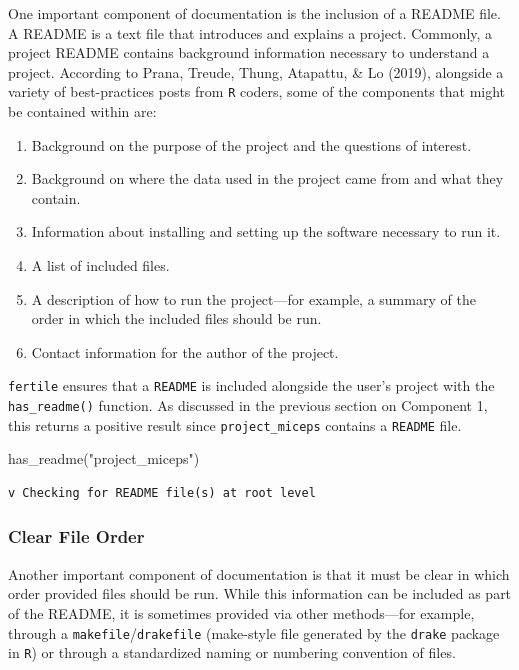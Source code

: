 \documentclass[12pt,twoside]{reedthesis}
\newenvironment{Shaded}{\begin{snugshade}}{\end{snugshade}}
\newcommand{\FunctionTok}[1]{\textcolor[rgb]{0.00,0.00,0.00}{#1}}
\newcommand{\NormalTok}[1]{#1}
\newcommand{\StringTok}[1]{\textcolor[rgb]{0.31,0.60,0.02}{#1}}
\providecommand{\tightlist}{%
  \setlength{\itemsep}{0pt}\setlength{\parskip}{0pt}}
\begin{document}
One important component of documentation is the inclusion of a README file. A README is a text file that introduces and explains a project. Commonly, a project README contains background information necessary to understand a project. According to Prana, Treude, Thung, Atapattu, \& Lo (2019), alongside a variety of best-practices posts from \texttt{R} coders, some of the components that might be contained within are:
\begin{enumerate}
\def\labelenumi{\arabic{enumi}.}
\tightlist
\item
  Background on the purpose of the project and the questions of interest.
\item
  Background on where the data used in the project came from and what they contain.
\item
  Information about installing and setting up the software necessary to run it.
\item
  A list of included files.
\item
  A description of how to run the project---for example, a summary of the order in which the included files should be run.
\item
  Contact information for the author of the project.
\end{enumerate}
\texttt{fertile} ensures that a \texttt{README} is included alongside the user's project with the \texttt{has\_readme()} function. As discussed in the previous section on Component 1, this returns a positive result since \texttt{project\_miceps} contains a \texttt{README} file.
\begin{Shaded}
\begin{Highlighting}[]
\FunctionTok{has\_readme}\NormalTok{(}\StringTok{"project\_miceps"}\NormalTok{)}
\end{Highlighting}
\end{Shaded}
\begin{verbatim}
v Checking for README file(s) at root level
\end{verbatim}
\hypertarget{clear-file-order}{%
\subsubsection{Clear File Order}\label{clear-file-order}}

Another important component of documentation is that it must be clear in which order provided files should be run. While this information can be included as part of the README, it is sometimes provided via other methods---for example, through a \texttt{makefile}/\texttt{drakefile} (make-style file generated by the \texttt{drake} package in \texttt{R}) or through a standardized naming or numbering convention of files.
\end{document}

